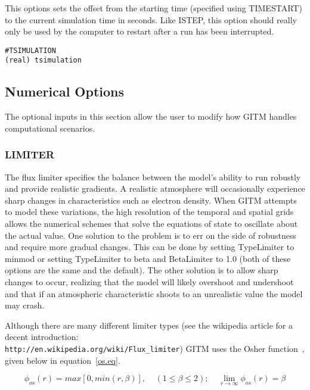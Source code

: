 This options sets the offset from the starting time (specified using TIMESTART) to the current simulation time in seconds.  Like ISTEP, this option should really only be used by the computer to restart after a run has been interrupted.

\begin{verbatim}
#TSIMULATION
(real) tsimulation    
\end{verbatim}


\subsection{Numerical Options}
\label{numerical.sec}

The optional inputs in this section allow the user to modify how GITM handles computational scenarios.

\subsubsection{LIMITER}
\label{limiter.sec}

The flux limiter specifies the balance between the model's ability to run robustly and provide realistic gradients.  A realistic atmosphere will occasionally experience sharp changes in characteristics such as electron density.  When GITM attempts to model these variations, the high resolution of the temporal and spatial grids allows the numerical schemes that solve the equations of state to oscillate about the actual value.  One solution to the problem is to err on the side of robustness and require more gradual changes.  This can be done by setting TypeLimiter to minmod or setting TypeLimiter to beta and BetaLimiter to 1.0 (both of these options are the same and the default).  The other solution is to allow sharp changes to occur, realizing that the model will likely overshoot and undershoot and that if an atmospheric characteristic shoots to an unrealistic value the model may crash.

Although there are many different limiter types (see the wikipedia article for a decent introduction: {\tt \\http://en.wikipedia.org/wiki/Flux\_limiter}) GITM uses the Osher function~\citep{Chakravarthy:1983os}, given below in equation~\ref{os.eq}.

\begin{equation}
\label{os.eq}
\phi_{os}(r) = max[0,min(r,\beta)], \;\;\;\; (1 \le \beta \le 2); \;\;\;\; \lim_{r\to\infty} \phi_{os}(r) = \beta
\end{equation}

